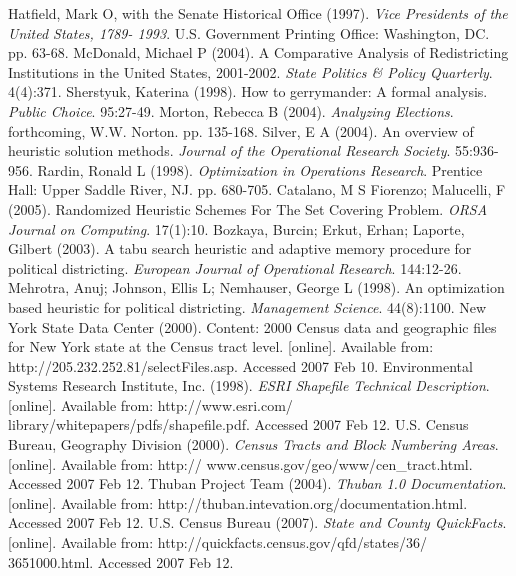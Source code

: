 \documentclass[11pt]{article}				%
\begin{document}
\begin{thebibliography}{1}

Hatfield, Mark O, with the Senate Historical Office
(1997). {\em Vice Presidents of the United States, 1789-
1993}. U.S. Government Printing Office: Washington, DC. pp. 63-68.
McDonald, Michael P (2004). A Comparative Analysis
of Redistricting Institutions in the United States, 2001-2002. {\em State 
Politics \& Policy Quarterly}. 4(4):371.
Sherstyuk, Katerina (1998). How to gerrymander: A
formal analysis. {\em Public Choice}. 95:27-49.
Morton, Rebecca B (2004). {\em Analyzing
Elections}. forthcoming, W.W. Norton. pp. 135-168.
Silver, E A (2004). An overview of heuristic
solution methods. {\em Journal of the Operational Research Society}.
55:936-956.
Rardin, Ronald L (1998). {\em Optimization in
Operations Research}. Prentice Hall: Upper Saddle River, NJ. pp. 680-705.
Catalano, M S Fiorenzo; Malucelli, F (2005).
Randomized Heuristic Schemes For The Set Covering Problem. {\em ORSA
Journal on Computing}. 17(1):10.
Bozkaya, Burcin; Erkut, Erhan; Laporte, Gilbert
(2003). A tabu search heuristic and adaptive memory procedure for
political districting. {\em European Journal of Operational Research}.
144:12-26.
Mehrotra, Anuj; Johnson, Ellis L; Nemhauser,
George L (1998). An optimization based heuristic for political
districting. {\em Management Science}. 44(8):1100.
New York State Data Center (2000). Content: 2000 Census data and geographic files for New York state at the Census tract level. [online]. Available from: http://205.232.252.81/selectFiles.asp. Accessed 2007 Feb 10.
Environmental Systems Research Institute, Inc. (1998). {\em ESRI Shapefile Technical Description}. [online]. Available from: http://www.esri.com/ library/whitepapers/pdfs/shapefile.pdf. Accessed 2007 Feb 12.
U.S. Census Bureau, Geography Division (2000). {\em Census Tracts and Block Numbering Areas}. [online]. Available from: http:// www.census.gov/geo/www/cen{\_}tract.html. Accessed 2007 Feb 12.
Thuban Project Team (2004). {\em Thuban 1.0 Documentation}. [online]. Available from: http://thuban.intevation.org/documentation.html. Accessed 2007 Feb 12.
U.S. Census Bureau (2007). {\em State and County QuickFacts}. [online]. Available from: http://quickfacts.census.gov/qfd/states/36/ 3651000.html. Accessed 2007 Feb 12.



\end{thebibliography}
\end{document}
